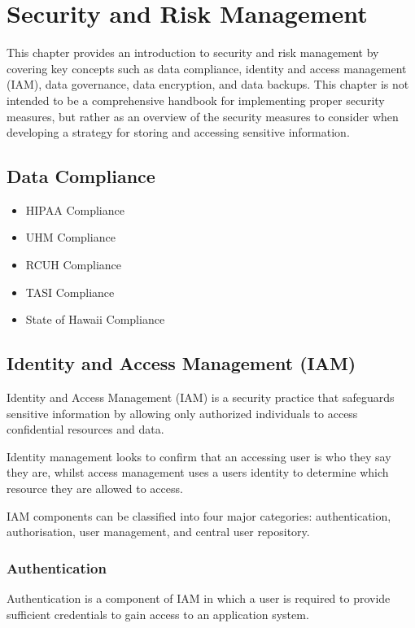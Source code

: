 \section{Security and Risk Management} \label{section: SARM}
This chapter provides an introduction to security and risk management by covering key concepts such as data compliance, identity and access management (IAM), data governance, data encryption, and data backups. This chapter is not intended to be a comprehensive handbook for implementing proper security measures, but rather as an overview of the security measures to consider when developing a strategy for storing and accessing sensitive information.

\subsection{Data Compliance}

\begin{itemize}
    \item HIPAA Compliance
    \item UHM Compliance
    \item RCUH Compliance
    \item TASI Compliance
    \item State of Hawaii Compliance
\end{itemize}

\subsection{Identity and Access Management (IAM)}
Identity and Access Management (IAM) is a security practice that safeguards sensitive information by allowing only authorized individuals to access confidential resources and data. 

Identity management looks to confirm that an accessing user is who they say they are, whilst access management uses a users identity to determine which resource they are allowed to access. 

IAM components can be classified into four major categories: authentication, authorisation, user management, and central user repository.

\subsubsection{Authentication}
Authentication is a component of IAM in which a user is required to provide sufficient credentials to gain access to an application system. 

